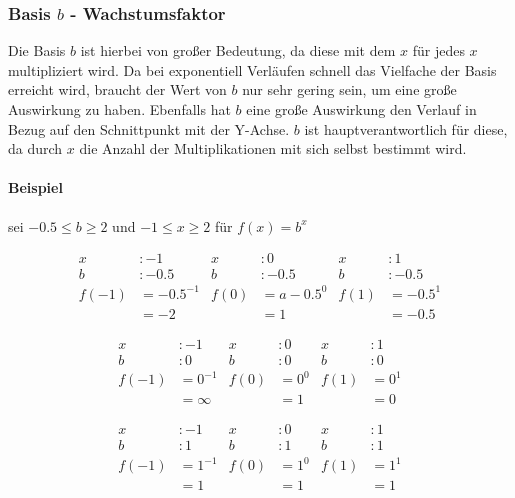   \subsubsection{Basis \mbox{\boldmath$b$} - Wachstumsfaktor } Die Basis $b$ ist hierbei von großer Bedeutung, da diese mit dem $x$ für jedes $x$ multipliziert wird. Da bei exponentiell Verläufen schnell das Vielfache der Basis erreicht wird, braucht der Wert von $b$ nur sehr gering sein, um eine große Auswirkung zu haben. Ebenfalls hat $b$ eine große Auswirkung den Verlauf in Bezug auf den Schnittpunkt mit der Y-Achse. $b$ ist hauptverantwortlich für diese, da durch $x$ die Anzahl der Multiplikationen mit sich selbst bestimmt wird. 


\paragraph{Beispiel} sei $-0.5\le b\ge 2 $ und $-1\le x\ge 2$ für $f(x)=b^x$
   	
\begin{align*} 
x&:-1           &  x &: 0              &  x &:1\\
b&:-0.5			& b&:-0.5					& b&:-0.5\\
f(-1)&=-0.5^{-1}	& f(0)&=a-0.5^0	& f(1)&=-0.5^1\\  
&= -2 & &=1 & &=-0.5
\end{align*}

\begin{align*}
x&:-1           &  x &: 0              &  x &:1\\
b&:0			& b&:0					& b&:0\\
f(-1)&=0^{-1}	& f(0)&=0^0	& f(1)&=0^1\\  
&= \infty & &=1 & &=0
\end{align*}

\begin{align*}
x&:-1           &  x &: 0              &  x &:1\\
b&:1			& b&:1					& b&:1\\
f(-1)&=1^{-1}	& f(0)&=1^0	& f(1)&=1^1\\  
&=1  & &=1 & &=1
\end{align*}

